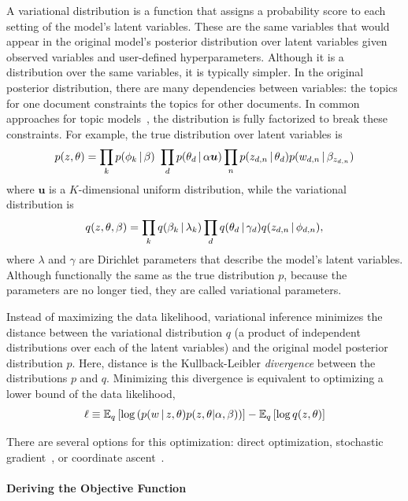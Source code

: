 A variational distribution is a function that assigns a probability score to each setting of the model's latent variables.
These are the same variables that would appear in the original model's posterior distribution over latent variables given observed variables and user-defined hyperparameters.
Although it is a distribution over the same variables, it is typically
simpler.  
In the original posterior distribution, there are many dependencies
between variables: the topics for one document constraints the topics
for other documents.
In common approaches for topic models~\citep{blei-03}, the
distribution is fully factorized to break these constraints.  For example, the true distribution
over latent variables is
\begin{equation}
p(z, \theta) = \prod_k p(\phi_k \, | \, \beta) \ \prod_d p(\theta_d \, | \,
    \alpha {\bm u}) \prod_n p(z_{d,n} \, | \, \theta_d) p(w_{d,n} \, | \,
    \beta_{z_{d,n}})
\end{equation}
where ${\bm u}$ is a $K$-dimensional uniform distribution, while the variational distribution is
\begin{equation}
q(z, \theta, \beta) = \prod_k q(\beta_k \, | \, \lambda_k) \prod_d q(\theta_d
  \, | \, \gamma_d) q(z_{d,n} \, | \, \phi_{d,n}),
\end{equation}
where $\lambda$ and $\gamma$ are Dirichlet parameters that describe
the model's latent variables.
Although functionally the same as the
true distribution $p$, because the parameters are no longer tied,
they are called variational parameters.

Instead of maximizing the data likelihood, variational inference
minimizes the distance between the variational distribution $q$ (a product of independent distributions over each of the latent variables) and the original model posterior distribution $p$.
Here, distance is the Kullback-Leibler
\emph{divergence} between the distributions $p$ and $q$.  Minimizing this divergence is
equivalent to optimizing a lower bound of the data likelihood,
\begin{equation}
  \ell \equiv \mathbb{E}_{q}\left[ \log \left(p(w \, | \, z, \theta) p(z, \theta | \alpha,
      \beta) \right)  \right] - \mathbb{E}_{q}\left[ \log q(z, \theta) \right]
\label{eq:obj}
\end{equation}

There are several options for this optimization: direct
optimization, stochastic gradient~\citep{hoffman-10}, or coordinate
ascent~\citep{blei-03}.

\paragraph{Deriving the Objective Function}

